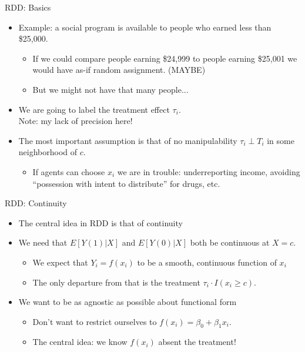 \begin{frame}{RDD: Basics}
\begin{itemize}
\item Example: a social program is available to people who earned less than \$25,000.
\begin{itemize}              
\item If we could compare people earning \$24,999 to people earning \$25,001 we would have as-if random assignment. (MAYBE)
\item But we might not have that many people...
\end{itemize}
\item We are going to label the \alert{treatment effect} $\tau_i$.\\
Note: my lack of precision here!
\item The most important assumption is that of \alert{no manipulability} $\tau_i  \perp T_i$ in some neighborhood of $c$.
\begin{itemize}
\item If agents can \alert{choose} $x_i$ we are in trouble: underreporting income, avoiding ``possession with intent to distribute'' for drugs, etc.
\end{itemize}              
\end{itemize}              
\end{frame}


\begin{frame}{RDD: Continuity}
\begin{itemize}
\item The central idea in RDD is that of \alert{continuity}
\item We need that $E[Y(1)  | X]$ and $E[Y(0) | X]$ both be continuous at $X=c$.
\begin{itemize}
\item We expect that $Y_i = f(x_i)$ to be a smooth, continuous function of $x_i$
\item The \alert{only} departure from that is the treatment $\tau_i \cdot I(x_i \geq c)$.
\end{itemize}
\item We want to be as agnostic as possible about \alert{functional form}
\begin{itemize}
\item Don't want to restrict ourselves to $f(x_i) = \beta_0 + \beta_1 x_i$.
\item The central idea: we know $f(x_i)$ absent the treatment!
\end{itemize}   
\end{itemize}              
\end{frame}


